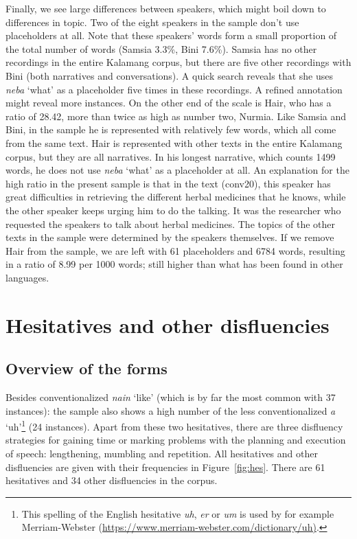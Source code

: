 \documentclass[output=paper,colorlinks,citecolor=brown
\ChapterDOI{10.5281/zenodo.15697587}
]{langscibook}
\begin{document}
Finally, we see large differences between speakers, which might boil down to differences in topic. Two of the eight speakers in the sample don't use placeholders at all. Note that these speakers' words form a small proportion of the total number of words (Samsia 3.3\%, Bini 7.6\%). Samsia has no other recordings in the entire Kalamang corpus, but there are five other recordings with Bini (both narratives and conversations). A quick search reveals that she uses \textit{neba} `what' as a placeholder five times in these recordings. A refined annotation might reveal more instances. On the other end of the scale is Hair, who has a ratio of 28.42, more than twice as high as number two, Nurmia. Like Samsia and Bini, in the sample he is represented with relatively few words, which all come from the same text. Hair is represented with other texts in the entire Kalamang corpus, but they are all narratives. In his longest narrative, which counts 1499 words, he does not use \textit{neba} `what' as a placeholder at all. An explanation for the high ratio in the present sample is that in the text (conv20), this speaker has great difficulties in retrieving the different herbal medicines that he knows, while the other speaker keeps urging him to do the talking. It was the researcher who requested the speakers to talk about herbal medicines. The topics of the other texts in the sample were determined by the speakers themselves. If we remove Hair from the sample, we are left with 61 placeholders and 6784 words, resulting in a ratio of 8.99 per 1000 words; still higher than what has been found in other languages.

\section{Hesitatives and other disfluencies}
\label{sec:hes}

\subsection{Overview of the forms}
Besides conventionalized \textit{nain} `like' (which is by far the most common with 37 instances): the sample also shows a high number of the less conventionalized \textit{a} `uh'\footnote{This spelling of the English hesitative \textit{uh}, \textit{er} or \textit{um} is used by for example Merriam-Webster (\url{https://www.merriam-webster.com/dictionary/uh)}.} (24 instances). Apart from these two hesitatives, there are three disfluency strategies for gaining time or marking problems with the planning and execution of speech: lengthening, mumbling and repetition. All hesitatives and other disfluencies are given with their frequencies in Figure~\ref{fig:hes}. There are 61 hesitatives and 34 other disfluencies in the corpus.
\end{document}
